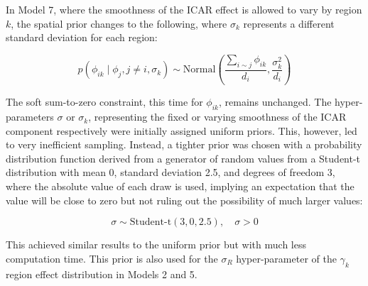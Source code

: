 \documentclass[webpdf,large,contemporary,namedate]{oup-authoring-template}
\theoremstyle{thmstyleone}
\theoremstyle{thmstyletwo}
\theoremstyle{thmstylethree}
\begin{document}
In Model 7, where the smoothness of the ICAR effect is allowed to vary
by region \(k\), the spatial prior changes to the following, where
\(\sigma_k\) represents a different standard deviation for each region:

\[
p(\phi_{ik} \mid \phi_j, {j \neq i}, \sigma_{k}) \sim \text{Normal}\left( \frac{\sum_{i \sim j} \phi_{ik}} {d_i}, \frac{\sigma^2_{k}}{d_i} \right)
\]

The soft sum-to-zero constraint, this time for \(\phi_{ik}\), remains
unchanged. The hyper-parameters \(\sigma\) or \(\sigma_k\), representing
the fixed or varying smoothness of the ICAR component respectively were
initially assigned uniform priors. This, however, led to very
inefficient sampling. Instead, a tighter prior was chosen with a
probability distribution function derived from a generator of random
values from a Student-t distribution with mean 0, standard deviation
2.5, and degrees of freedom 3, where the absolute value of each draw is
used, implying an expectation that the value will be close to zero but
not ruling out the possibility of much larger values:

\[
\sigma \sim \text{Student-t}(3, 0, 2.5), \quad \sigma > 0
\]

This achieved similar results to the uniform prior but with much less
computation time. This prior is also used for the \(\sigma_R\)
hyper-parameter of the \(\gamma_k\) region effect distribution in Models
2 and 5.
\end{document}
